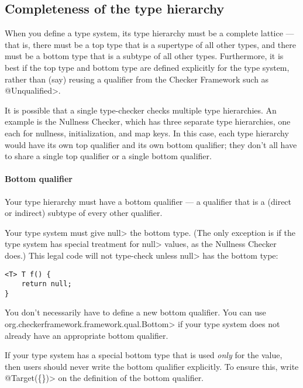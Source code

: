 \subsection{Completeness of the type hierarchy\label{bottom-and-top-qualifier}}

When you define a type system, its type hierarchy must be a
complete lattice --- that is, there must be a top type that is a
supertype of all other types, and there must be a bottom type that is a
subtype of all other types.
Furthermore, it is best if the top type and bottom type are defined
explicitly for the type system, rather than (say) reusing a qualifier from the
Checker Framework such as \<@Unqualified>.

It is possible that a single type-checker checks multiple type hierarchies.
An example is the Nullness Checker, which has three separate type
hierarchies, one each for
nullness, initialization, and map keys.  In this case, each type hierarchy
would have its own top qualifier and its own bottom qualifier; they don't
all have to share a single top qualifier or a single bottom qualifier.


\paragraph{Bottom qualifier\label{bottom-qualifier}}
Your type hierarchy must have a bottom qualifier
--- a qualifier that is a (direct or indirect) subtype of every other
qualifier.

Your type system must give \<null> the bottom type.  (The only exception
is if the type system has special treatment for \<null> values, as the
Nullness Checker does.)  This legal code
will not type-check unless \<null> has the bottom type:
\begin{Verbatim}
<T> T f() {
    return null;
}
\end{Verbatim}

\begin{sloppypar}
You don't necessarily have to define a new bottom qualifier.  You can
use \<org.checkerframework.framework.qual.Bottom> if your type system does not already have an
appropriate bottom qualifier.
\end{sloppypar}

If your type system has a special bottom type that is used \emph{only} for
the  value, then users should never write the bottom qualifier
explicitly.  To ensure this, write \<@Target(\{\})> on the definition of
the bottom qualifier.


